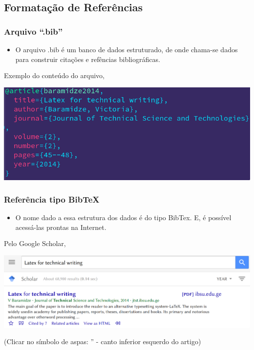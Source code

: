 \documentclass{beamer}
\begin{document}
\begin{frame}

 \section{Formatação de Referências}
  \frametitle{Arquivo ``.bib''}

  \begin{itemize}
  \item O arquivo .bib é um banco de dados estruturado, de onde chama-se
  dados para construir citações e refências bibliográficas.
\end{itemize}

\vspace{0.2cm}

Exemplo do conteúdo do arquivo,
\begin{center}
  \includegraphics[scale=0.40]{../Imagens/A2I101.png}
\end{center}

\end{frame}

\begin{frame}

  \frametitle{Referência tipo BibTeX}

  \begin{itemize}
  \item O nome dado a essa estrutura dos dados é do tipo BibTex. E, é
    possível acessá-las prontas na Internet.
\end{itemize}

\vspace{0.2cm}

Pelo Google Scholar,
\begin{center}
  \includegraphics[scale=0.20]{../Imagens/A2I102.png}
\end{center}
\vspace{0.2cm}
(Clicar no símbolo de aspas: '' - canto inferior esquerdo do artigo)


\end{frame}
\end{document}
